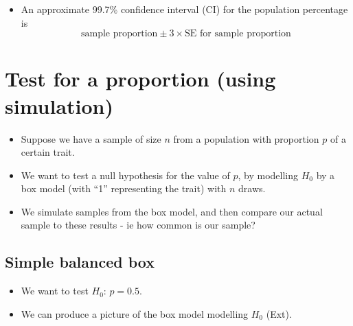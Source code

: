 \documentclass[]{article}
\newenvironment{Shaded}{\begin{snugshade}}{\end{snugshade}}
\newcommand{\CommentTok}[1]{\textcolor[rgb]{0.56,0.35,0.01}{\textit{#1}}}
\newcommand{\DecValTok}[1]{\textcolor[rgb]{0.00,0.00,0.81}{#1}}
\newcommand{\KeywordTok}[1]{\textcolor[rgb]{0.13,0.29,0.53}{\textbf{#1}}}
\newcommand{\NormalTok}[1]{#1}
\newcommand{\OperatorTok}[1]{\textcolor[rgb]{0.81,0.36,0.00}{\textbf{#1}}}
\newcommand{\StringTok}[1]{\textcolor[rgb]{0.31,0.60,0.02}{#1}}
\providecommand{\tightlist}{%
  \setlength{\itemsep}{0pt}\setlength{\parskip}{0pt}}
\begin{document}
\begin{Shaded}
\end{Shaded}

\begin{itemize}
\tightlist
\item
  An approximate 99.7\% confidence interval (CI) for the population percentage is
  \[\mbox{sample proportion} \pm 3 \times \mbox{SE for sample proportion} \]
\end{itemize}

\begin{Shaded}
\end{Shaded}

\hypertarget{testforproportion}{%
\section{Test for a proportion (using simulation)}\label{testforproportion}}

\begin{itemize}
\item
  Suppose we have a sample of size \(n\) from a population with proportion \(p\) of a certain trait.
\item
  We want to test a null hypothesis for the value of \(p\), by modelling \(H_{0}\) by a box model (with ``1'' representing the trait) with \(n\) draws.
\item
  We simulate samples from the box model, and then compare our actual sample to these results - ie how common is our sample?
\end{itemize}

\hypertarget{simple-balanced-box}{%
\subsection{Simple balanced box}\label{simple-balanced-box}}

\begin{itemize}
\item
  We want to test \(H_{0}\): \(p = 0.5\).
\item
  We can produce a picture of the box model modelling \(H_{0}\) (Ext).
\end{itemize}
\end{document}
